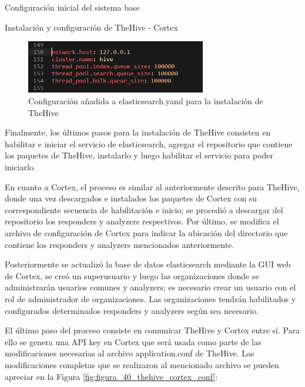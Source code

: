 \begin{section}{Configuración inicial del sistema base}
\begin{subsection}{Instalación y configuración de TheHive - Cortex}
        \begin{figure}[H]
            \centering
            \includegraphics[width=0.7\textwidth]{./iteracion_2_imagenes/figura_39_thehive_conf_elastic.png}
            \caption{Configuración añadida a elasticsearch.yaml para la instalación de TheHive}
            \label{fig:figura_39_thehive_conf}
        \end{figure}
        Finalmente, los últimos pasos para la instalación de TheHive consisten en habilitar e iniciar el servicio de elasticsearch, agregar el repositorio que contiene los paquetes de TheHive, instalarlo y luego habilitar el servicio para poder iniciarlo. \par
        En cuanto a Cortex, el proceso es similar al anteriormente descrito para TheHive, donde una vez descargados e instalados los paquetes de Cortex con su correspondiente secuencia de habilitación e inicio; se procedió a descargar del repositorio los responders y analyzers respectivos. Por último, se modifica el archivo de configuración de Cortex para indicar la ubicación del directorio que contiene los responders y analyzers mencionados anteriormente. \par
        Posteriormente se actualizó la base de datos elasticsearch mediante la GUI web de Cortex, se creó un superusuario y luego las organizaciones donde se administrarán usuarios comunes y analyzers; es necesario crear un usuario con el rol de administrador de organizaciones. Las organizaciones tendrán habilitados y configurados determinados responders y analyzers según sea necesario. \par
        El último paso del proceso consiste en comunicar TheHive y Cortex entre sí. Para ello se genera una API key en Cortex que será usada como parte de las modificaciones necesarias al archivo application.conf de TheHive. Las modificaciones completas que se realizaron al mencionado archivo se pueden apreciar en la Figura \ref{fig:figura_40_thehive_cortex_conf}:\par
        

\end{subsection}
\end{section}

